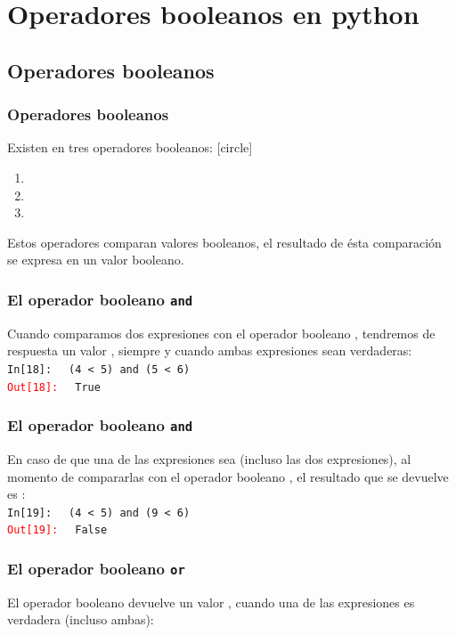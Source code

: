 \documentclass[12pt]{beamer}
\begin{document}
{\section{Operadores booleanos en python}
\subsection{Operadores booleanos}
\begin{frame}
\frametitle{Operadores booleanos}
Existen en \python{} tres operadores booleanos:
[circle]
\begin{enumerate}[<+->]
\item {}
\item {}
\item {}
\end{enumerate}
\pause
Estos operadores comparan valores booleanos, el resultado de ésta comparación se expresa en un valor booleano.
\end{frame}
\begin{frame}[fragile]
\frametitle{El operador booleano \texttt{and}}
Cuando comparamos dos expresiones con el operador booleano , tendremos de respuesta un valor , siempre y cuando ambas expresiones sean verdaderas:
\\
\bigskip
\pause
\textcolor{ao}{\texttt{In[18]: }} \verb| (4 < 5) and (5 < 6)| \\
\pause
\textcolor{red}{\texttt{Out[18]: }} \verb| True|
\end{frame}
\begin{frame}[fragile]
\frametitle{El operador booleano \texttt{and}}
En caso de que una de las expresiones sea  (incluso las dos expresiones), al momento de compararlas con el operador booleano , el resultado que se devuelve es :
\\
\bigskip
\pause
\textcolor{ao}{\texttt{In[19]: }} \verb| (4 < 5) and (9 < 6)| \\
\pause
\textcolor{red}{\texttt{Out[19]: }} \verb| False|
\end{frame}
\begin{frame}[fragile]
\frametitle{El operador booleano \texttt{or}}
El operador booleano  devuelve un valor , cuando una de las expresiones es verdadera (incluso ambas):
\\

\end{frame}}
\end{document}
